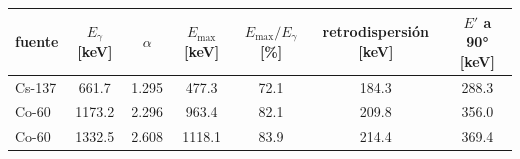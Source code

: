 \begin{tabular}{lcccccc}
\toprule
\textbf{fuente} & \textbf{$E_\gamma$ [keV]} & \textbf{$\alpha$} & \textbf{$E_{\max}$ [keV]} & \textbf{$E_{\max}/E_\gamma$ [\%]} & \textbf{retrodispersión [keV]} & \textbf{$E'$ a 90° [keV]} \\
\midrule
Cs-137 & 661.7 & 1.295 & 477.3 & 72.1 & 184.3 & 288.3 \\
Co-60 & 1173.2 & 2.296 & 963.4 & 82.1 & 209.8 & 356.0 \\
Co-60 & 1332.5 & 2.608 & 1118.1 & 83.9 & 214.4 & 369.4 \\
\bottomrule
\end{tabular}
